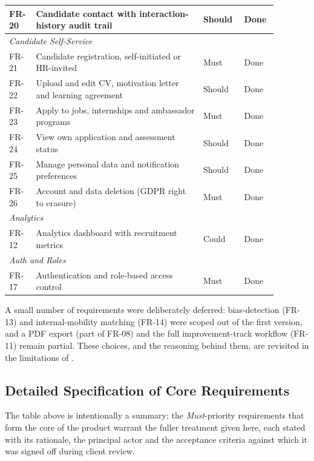 \begin{table}[H]
\begin{tabular}{p{0.07\linewidth}p{0.58\linewidth}p{0.13\linewidth}p{0.10\linewidth}}
FR-20 & Candidate contact with interaction-history audit trail & Should & Done \\
\midrule
\multicolumn{4}{l}{\textit{Candidate Self-Service}} \\
FR-21 & Candidate registration, self-initiated or HR-invited & Must & Done \\
FR-22 & Upload and edit CV, motivation letter and learning agreement & Should & Done \\
FR-23 & Apply to jobs, internships and ambassador programs & Must & Done \\
FR-24 & View own application and assessment status & Should & Done \\
FR-25 & Manage personal data and notification preferences & Should & Done \\
FR-26 & Account and data deletion (GDPR right to erasure) & Must & Done \\
\midrule
\multicolumn{4}{l}{\textit{Analytics}} \\
FR-12 & Analytics dashboard with recruitment metrics & Could & Done \\
\midrule
\multicolumn{4}{l}{\textit{Auth and Roles}} \\
FR-17 & Authentication and role-based access control & Must & Done \\
\bottomrule
\end{tabular}
\end{table}

A small number of requirements were deliberately deferred: bias-detection
(FR-13) and internal-mobility matching (FR-14) were scoped out of the first
version, and a PDF export (part of FR-08) and the full improvement-track
workflow (FR-11) remain partial. These choices, and the reasoning behind
them, are revisited in the limitations of .

\subsection{Detailed Specification of Core Requirements}
\label{sec:analysis-fr-detail}

The table above is intentionally a summary; the \emph{Must}-priority
requirements that form the core of the product warrant the fuller treatment
given here, each stated with its rationale, the principal actor and the
acceptance criteria against which it was signed off during client review.

